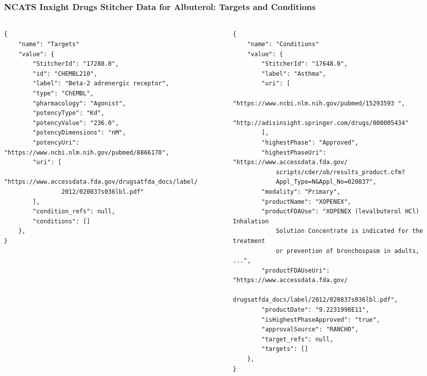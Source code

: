 \documentclass[aspectratio=169,xcolor=dvipsnames]{beamer}
\begin{document}
\begin{frame}[fragile,t]
  \frametitle{NCATS Inxight Drugs Stitcher Data for Albuterol: Targets and Conditions}
  \framesubtitle{}
  \tiny
  \begin{columns}[t]
    \begin{column}{0.5\textwidth}
    \vspace{-3\baselineskip}
\begin{verbatim}
{
    "name": "Targets"
    "value": {
        "StitcherId": "17288.0",
        "id": "CHEMBL210",
        "label": "Beta-2 adrenergic receptor",
        "type": "ChEMBL",
        "pharmacology": "Agonist",
        "potencyType": "Kd",
        "potencyValue": "236.0",
        "potencyDimensions": "nM",
        "potencyUri": "https://www.ncbi.nlm.nih.gov/pubmed/8866170",
        "uri": [
            "https://www.accessdata.fda.gov/drugsatfda_docs/label/
                2012/020837s036lbl.pdf"
        ],
        "condition_refs": null,
        "conditions": []
    },
}
\end{verbatim}
    \end{column}
    \begin{column}{0.5\textwidth}
    \vspace{-3\baselineskip}
\begin{verbatim}
{
    "name": "Conditions"
    "value": {
        "StitcherId": "17648.0",
        "label": "Asthma",
        "uri": [
            "https://www.ncbi.nlm.nih.gov/pubmed/15293593 ",
            "http://adisinsight.springer.com/drugs/800005434"
        ],
        "highestPhase": "Approved",
        "highestPhaseUri": "https://www.accessdata.fda.gov/
            scripts/cder/ob/results_product.cfm?
            Appl_Type=N&Appl_No=020837",
        "modality": "Primary",
        "productName": "XOPENEX",
        "productFDAUse": "XOPENEX (levalbuterol HCl) Inhalation
            Solution Concentrate is indicated for the treatment
            or prevention of bronchospasm in adults, ...",
        "productFDAUseUri": "https://www.accessdata.fda.gov/
            drugsatfda_docs/label/2012/020837s036lbl.pdf",
        "productDate": "9.2231998E11",
        "isHighestPhaseApproved": "true",
        "approvalSource": "RANCHO",
        "target_refs": null,
        "targets": []
    },
}
\end{verbatim}
    \end{column}
  \end{columns}
\end{frame}
\end{document}
